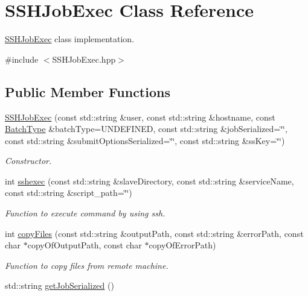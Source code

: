 \hypertarget{classSSHJobExec}{
\section{SSHJobExec Class Reference}
\label{classSSHJobExec}
}


\hyperlink{classSSHJobExec}{SSHJobExec} class implementation.  




{\ttfamily \#include $<$SSHJobExec.hpp$>$}

\subsection*{Public Member Functions}
\begin{DoxyCompactItemize}
\item 
\hyperlink{classSSHJobExec_a39f54584e7926a280f4b529066820a02}{SSHJobExec} (const std::string \&user, const std::string \&hostname, const \hyperlink{utilVishnu_8hpp_a864d748e7097d176552dd4c7635016ea}{BatchType} \&batchType=UNDEFINED, const std::string \&jobSerialized=\char`\"{}\char`\"{}, const std::string \&submitOptionsSerialized=\char`\"{}\char`\"{}, const std::string \&ssKey=\char`\"{}\char`\"{})
\begin{DoxyCompactList}\small\item\em Constructor. \item\end{DoxyCompactList}\item 
int \hyperlink{classSSHJobExec_ad0172cc17613578c6f2eebaed2404ce0}{sshexec} (const std::string \&slaveDirectory, const std::string \&serviceName, const std::string \&script\_\-path=\char`\"{}\char`\"{})
\begin{DoxyCompactList}\small\item\em Function to execute command by using ssh. \item\end{DoxyCompactList}\item 
int \hyperlink{classSSHJobExec_ae422bcb5022de94c945109142c5f9fdc}{copyFiles} (const std::string \&outputPath, const std::string \&errorPath, const char $\ast$copyOfOutputPath, const char $\ast$copyOfErrorPath)
\begin{DoxyCompactList}\small\item\em Function to copy files from remote machine. \item\end{DoxyCompactList}\item 
std::string \hyperlink{classSSHJobExec_a760e6236808e1ca96832aa2ed4e6c997}{getJobSerialized} ()

\end{DoxyCompactItemize}
